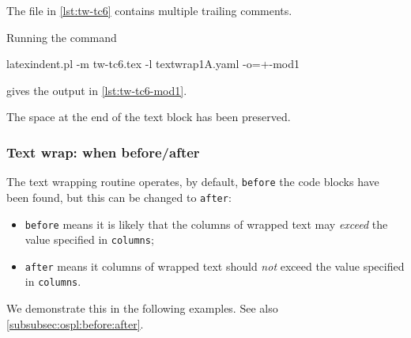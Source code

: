  \begin{example}
 The file in \cref{lst:tw-tc6} contains multiple trailing comments.

 Running the command

 \begin{commandshell}
latexindent.pl -m tw-tc6.tex -l textwrap1A.yaml -o=+-mod1 
\end{commandshell}

 gives the output in \cref{lst:tw-tc6-mod1}.
 \begin{cmhtcbraster}[raster column skip=.1\linewidth]
 \end{cmhtcbraster}
 The space at the end of the text block has been preserved.
 \end{example}

\subsubsection{Text wrap: when before/after}\label{subsubsec:tw:before:after}
 The text wrapping routine operates, by default, \texttt{before} the  code blocks have been found, but this can be changed to
 \texttt{after}:
 \begin{itemize}
  \item \texttt{before} means it is likely that the columns of wrapped text may \emph{exceed} the
        value specified in \texttt{columns};
  \item \texttt{after} means it columns of wrapped text should \emph{not} exceed the value
        specified in \texttt{columns}.
 \end{itemize}
 We demonstrate this in the following examples. See also
 \cref{subsubsec:ospl:before:after}.

